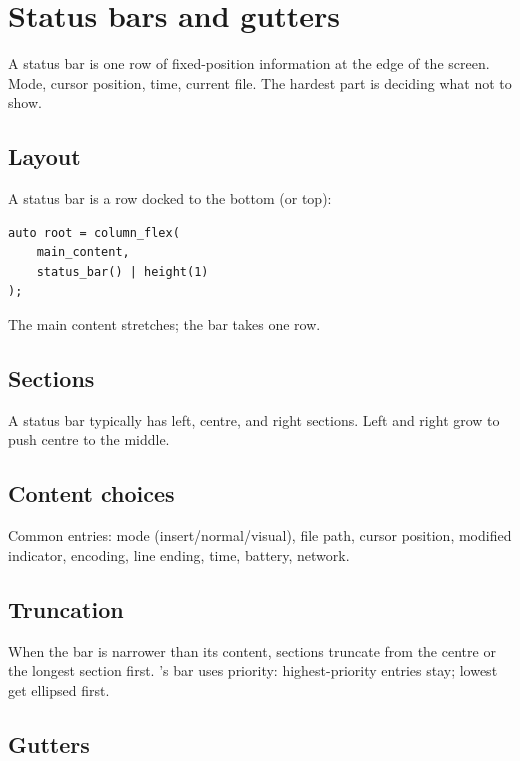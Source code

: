 \chapter{Status bars and gutters}
\label{ch:statusbar}

\begin{aside}
A status bar is one row of fixed-position information at the
edge of the screen. Mode, cursor position, time, current
file. The hardest part is deciding what not to show.
\end{aside}

\section{Layout}

A status bar is a row docked to the bottom (or top):

\begin{lstlisting}
auto root = column_flex(
    main_content,
    status_bar() | height(1)
);
\end{lstlisting}

The main content stretches; the bar takes one row.

\section{Sections}

A status bar typically has left, centre, and right sections.
Left and right grow to push centre to the middle.

\section{Content choices}

Common entries: mode (insert/normal/visual), file path,
cursor position, modified indicator, encoding, line ending,
time, battery, network.

\section{Truncation}

When the bar is narrower than its content, sections truncate
from the centre or the longest section first. \maya{}'s bar
uses priority: highest-priority entries stay; lowest get
ellipsed first.

\section{Gutters}

